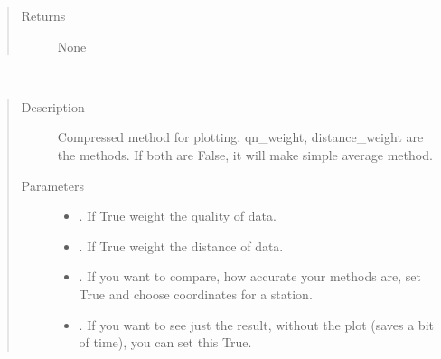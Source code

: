 \documentclass[letterpaper,10pt,english]{sphinxmanual}
\begin{document}
\begin{fulllineitems}
\begin{fulllineitems}
\begin{quote}
\begin{description}
\item[{Returns}] \leavevmode
\sphinxAtStartPar
None

\end{description}\end{quote}

\end{fulllineitems}


\begin{fulllineitems}
\label{\detokenize{DwdMain:DwdMain.DwdMain.main_plotter_data}}~\begin{quote}\begin{description}
\item[{Description}] \leavevmode
\sphinxAtStartPar
Compressed method for plotting. qn\_weight, distance\_weight are the methods. If both are False, it will make simple average method.

\item[{Parameters}] \leavevmode\begin{itemize}
\item {} 
\sphinxAtStartPar
{} \textendash{} . If True weight the quality of data.

\item {} 
\sphinxAtStartPar
{} \textendash{} . If True weight the distance of data.

\item {} 
\sphinxAtStartPar
{} \textendash{} . If you want to compare, how accurate your methods are, set True and choose coordinates for a station.

\item {} 
\sphinxAtStartPar
{} \textendash{} . If you want to see just the result, without the plot (saves a bit of time), you can set this True.


\end{itemize}
\end{description}
\end{quote}
\end{fulllineitems}
\end{fulllineitems}
\end{document}
